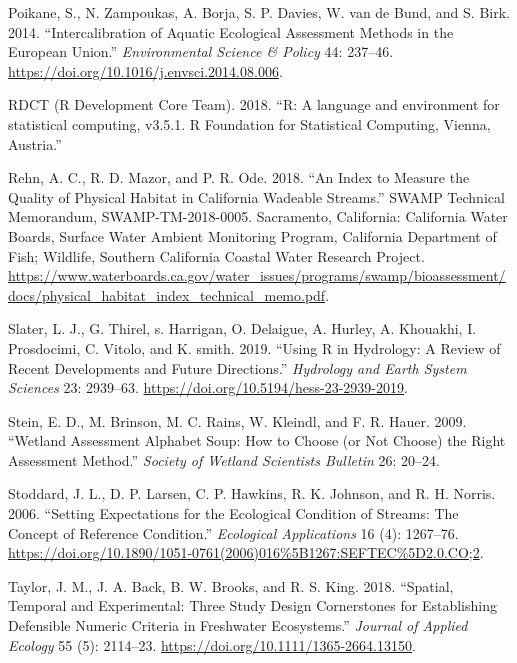 \documentclass[fleqn,10pt,lineno]{wlpeerj} %
\begin{document}
\leavevmode\hypertarget{ref-Poikane14}{}%
Poikane, S., N. Zampoukas, A. Borja, S. P. Davies, W. van de Bund, and S. Birk. 2014. ``Intercalibration of Aquatic Ecological Assessment Methods in the European Union.'' \emph{Environmental Science \& Policy} 44: 237--46. \url{https://doi.org/10.1016/j.envsci.2014.08.006}.

\leavevmode\hypertarget{ref-RDCT18}{}%
RDCT (R Development Core Team). 2018. ``R: A language and environment for statistical computing, v3.5.1. R Foundation for Statistical Computing, Vienna, Austria.''

\leavevmode\hypertarget{ref-Rehn18}{}%
Rehn, A. C., R. D. Mazor, and P. R. Ode. 2018. ``An Index to Measure the Quality of Physical Habitat in California Wadeable Streams.'' SWAMP Technical Memorandum, SWAMP-TM-2018-0005. Sacramento, California: California Water Boards, Surface Water Ambient Monitoring Program, California Department of Fish; Wildlife, Southern California Coastal Water Research Project. \url{https://www.waterboards.ca.gov/water_issues/programs/swamp/bioassessment/docs/physical_habitat_index_technical_memo.pdf}.

\leavevmode\hypertarget{ref-Slater19}{}%
Slater, L. J., G. Thirel, s. Harrigan, O. Delaigue, A. Hurley, A. Khouakhi, I. Prosdocimi, C. Vitolo, and K. smith. 2019. ``Using R in Hydrology: A Review of Recent Developments and Future Directions.'' \emph{Hydrology and Earth System Sciences} 23: 2939--63. \url{https://doi.org/10.5194/hess-23-2939-2019}.

\leavevmode\hypertarget{ref-Stein09}{}%
Stein, E. D., M. Brinson, M. C. Rains, W. Kleindl, and F. R. Hauer. 2009. ``Wetland Assessment Alphabet Soup: How to Choose (or Not Choose) the Right Assessment Method.'' \emph{Society of Wetland Scientists Bulletin} 26: 20--24.

\leavevmode\hypertarget{ref-Stoddard06}{}%
Stoddard, J. L., D. P. Larsen, C. P. Hawkins, R. K. Johnson, and R. H. Norris. 2006. ``Setting Expectations for the Ecological Condition of Streams: The Concept of Reference Condition.'' \emph{Ecological Applications} 16 (4): 1267--76. \url{https://doi.org/10.1890/1051-0761(2006)016\%5B1267:SEFTEC\%5D2.0.CO;2}.

\leavevmode\hypertarget{ref-Taylor18}{}%
Taylor, J. M., J. A. Back, B. W. Brooks, and R. S. King. 2018. ``Spatial, Temporal and Experimental: Three Study Design Cornerstones for Establishing Defensible Numeric Criteria in Freshwater Ecosystems.'' \emph{Journal of Applied Ecology} 55 (5): 2114--23. \url{https://doi.org/10.1111/1365-2664.13150}.
\end{document}
